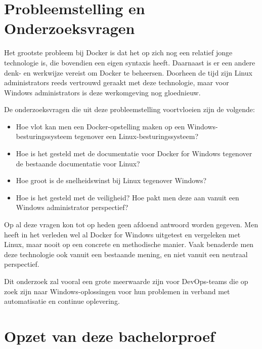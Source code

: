 \section{Probleemstelling en Onderzoeksvragen}
\label{sec:onderzoeksvragen}


Het grootste probleem bij Docker is dat het op zich nog een relatief jonge technologie is, die bovendien een eigen syntaxis heeft. Daarnaast is er een andere denk- en werkwijze vereist om Docker te beheersen. Doorheen de tijd zijn Linux administrators reeds vertrouwd geraakt met deze technologie, maar voor Windows administrators is deze werkomgeving
nog gloednieuw.

De onderzoeksvragen die uit deze probleemstelling voortvloeien zijn de volgende:

\begin{itemize}[noitemsep]
	\item Hoe vlot kan men een Docker-opstelling maken op een Windows-besturingssysteem tegenover een Linux-besturingssysteem?
	\item Hoe is het gesteld met de documentatie voor Docker for Windows tegenover de bestaande documentatie voor Linux?
	\item Hoe groot is de snelheidswinst bij Linux tegenover Windows?
	\item Hoe is het gesteld met de veiligheid? Hoe pakt men deze aan vanuit een Windows administrator perspectief?
\end{itemize}

Op al deze vragen kon tot op heden geen afdoend antwoord worden gegeven. Men heeft in het verleden wel al Docker for Windows uitgetest en vergeleken met Linux, maar nooit op een concrete en methodische manier. Vaak benaderde men deze technologie ook vanuit een bestaande mening, en niet vanuit een neutraal perspectief.

Dit onderzoek zal vooral een grote meerwaarde zijn voor DevOps-teams die op zoek zijn naar Windows-oplossingen voor hun problemen in verband met automatisatie en continue oplevering.

\section{Opzet van deze bachelorproef}
\label{sec:opzet-bachelorproef}

